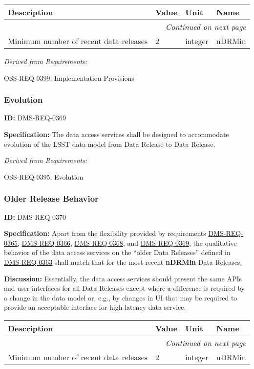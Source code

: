\documentclass[SE,toc,lsstdraft]{lsstdoc}
\makeatletter
\newcommand{\paramname}[1]{\hspace{0pt}#1}
\newcommand{\unitname}[1]{\hspace{0pt}#1}
\newenvironment{parameters}[0]{%
\setlength\LTleft{0pt}
\setlength\LTright{\fill}
\begin{small}
\begin{longtable}[]{|p{0.49\textwidth}|l|p{0.6in}|p{1.70in}@{}|}

\hline \textbf{Description} & \textbf{Value} & \textbf{Unit} & \textbf{Name} \\ \hline
\endhead

\hline \multicolumn{4}{r}{\emph{Continued on next page}} \\
\endfoot

\hline\hline
\endlastfoot
}{%
\hline
\end{longtable}
\end{small}
}
\makeatother
\begin{document}
\begin{parameters}
Minimum number of recent data releases
&
2
&
\unitname{%
integer
}
&
\paramname{%
nDRMin
} \\\hline
\end{parameters}

\emph{Derived from Requirements:}

OSS-REQ-0399:
Implementation Provisions \newline

\subsubsection{Evolution}

\label{DMS-REQ-0369}
\textbf{ID:} DMS-REQ-0369

\textbf{Specification:}
The data access services shall be designed to accommodate evolution of the LSST data model from Data Release to Data Release.

\emph{Derived from Requirements:}

OSS-REQ-0395:
Evolution \newline

\subsubsection{Older Release Behavior}

\label{DMS-REQ-0370}
\textbf{ID:} DMS-REQ-0370

\textbf{Specification:}
Apart from the flexibility provided by requirements \hyperref[DMS-REQ-0365]{DMS-REQ-0365}, \hyperref[DMS-REQ-0366]{DMS-REQ-0366}, \hyperref[DMS-REQ-0368]{DMS-REQ-0368}, and \hyperref[DMS-REQ-0369]{DMS-REQ-0369}, the qualitative behavior of the data access services on the “older Data Releases” defined in \hyperref[DMS-REQ-0363]{DMS-REQ-0363} shall match that for the most recent \textbf{nDRMin} Data Releases.

\textbf{Discussion:}
Essentially, the data access services should present the same APIs and user interfaces for all Data Releases except where a difference is required by a change in the data model or, e.g., by changes in UI that may be required to provide an acceptable interface for high-latency data service.

\begin{parameters}
Minimum number of recent data releases
&
2
&
\unitname{%
integer
}
&
\paramname{%
nDRMin
} \\\hline
\end{parameters}
\end{document}
